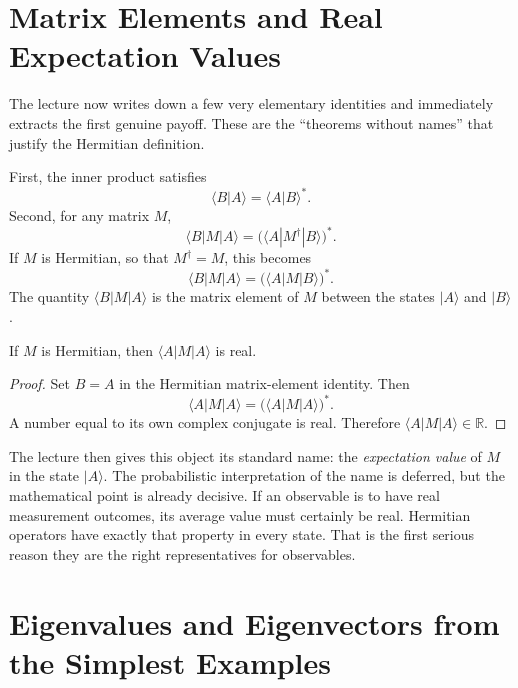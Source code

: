 \section{Matrix Elements and Real Expectation Values}

The lecture now writes down a few very elementary identities and immediately extracts the first genuine payoff. These are the ``theorems without names'' that justify the Hermitian definition.

First, the inner product satisfies
\begin{equation}
\langle B|A\rangle=\langle A|B\rangle^*.
\end{equation}
Second, for any matrix \(M\),
\begin{equation}
\langle B|M|A\rangle=\bigl(\langle A|M^\dagger|B\rangle\bigr)^*.
\end{equation}
If \(M\) is Hermitian, so that \(M^\dagger=M\), this becomes
\begin{equation}
\langle B|M|A\rangle=\bigl(\langle A|M|B\rangle\bigr)^*.
\end{equation}
The quantity \(\langle B|M|A\rangle\) is the matrix element of \(M\) between the states \(|A\rangle\) and \(|B\rangle\).

\begin{proposition}
If \(M\) is Hermitian, then \(\langle A|M|A\rangle\) is real.
\end{proposition}

\begin{proof}
Set \(B=A\) in the Hermitian matrix-element identity. Then
\begin{equation}
\langle A|M|A\rangle=\bigl(\langle A|M|A\rangle\bigr)^*.
\end{equation}
A number equal to its own complex conjugate is real. Therefore \(\langle A|M|A\rangle\in\mathbb{R}\).
\end{proof}

The lecture then gives this object its standard name: the \emph{expectation value} of \(M\) in the state \(|A\rangle\). The probabilistic interpretation of the name is deferred, but the mathematical point is already decisive. If an observable is to have real measurement outcomes, its average value must certainly be real. Hermitian operators have exactly that property in every state. That is the first serious reason they are the right representatives for observables.

\section{Eigenvalues and Eigenvectors from the Simplest Examples}

